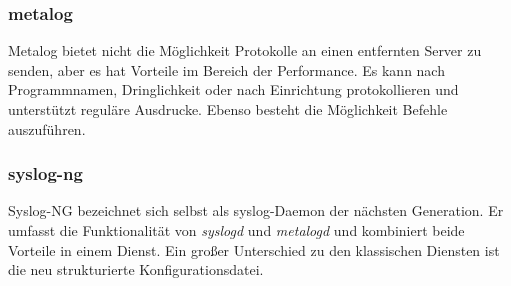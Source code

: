 \subsubsection*{metalog}
Metalog bietet nicht die Möglichkeit Protokolle an einen entfernten Server zu senden, aber es hat Vorteile im Bereich der Performance. Es kann nach Programmnamen, Dringlichkeit oder nach Einrichtung protokollieren und unterstützt reguläre Ausdrucke. Ebenso besteht die Möglichkeit Befehle auszuführen. \cite{GentooProtokollierung}

\subsubsection*{syslog-ng}
Syslog-NG bezeichnet sich selbst als syslog-Daemon der nächsten Generation. Er umfasst die Funktionalität von \textit{syslogd} und \textit{metalogd} und kombiniert beide Vorteile in einem Dienst. \cite{GentooProtokollierung} Ein großer Unterschied zu den klassischen Diensten ist die neu strukturierte Konfigurationsdatei.